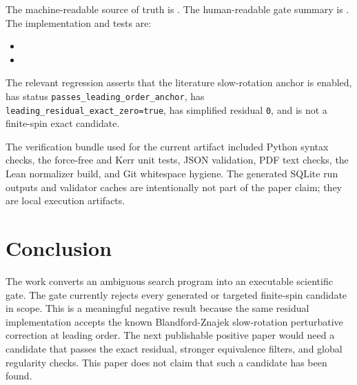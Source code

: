 \documentclass[11pt]{article}
\newcommand{\code}[1]{\texttt{#1}}
\begin{document}
The machine-readable source of truth is
.  The human-readable gate summary is
.  The implementation and tests are:
\begin{itemize}
  \item {}
  \item {}
\end{itemize}
The relevant regression asserts that the literature slow-rotation anchor is
enabled, has status
\texttt{passes\_\allowbreak leading\_\allowbreak order\_\allowbreak anchor}, has
\texttt{leading\_\allowbreak residual\_\allowbreak exact\_\allowbreak zero=true},
has simplified residual \code{0},
and is not a finite-spin exact candidate.

The verification bundle used for the current artifact included Python syntax
checks, the force-free and Kerr unit tests, JSON validation, PDF text checks,
the Lean normalizer build, and Git whitespace hygiene.  The generated SQLite
run outputs and validator caches are intentionally not part of the paper
claim; they are local execution artifacts.

\section{Conclusion}

The work converts an ambiguous search program into an executable scientific
gate.  The gate currently rejects every generated or targeted finite-spin
candidate in scope.  This is a meaningful negative result because the same
residual implementation accepts the known Blandford-Znajek slow-rotation
perturbative correction at leading order.  The next publishable positive paper
would need a candidate that passes the exact residual, stronger equivalence
filters, and global regularity checks.  This paper does not claim that such a
candidate has been found.
\end{document}
